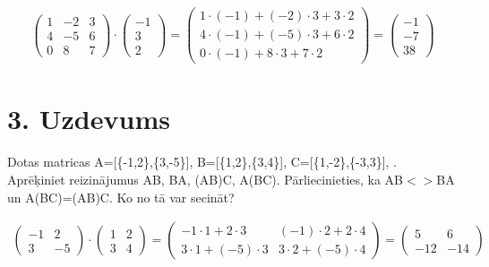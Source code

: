 \documentclass{article}
\begin{document}
\begin{gather*}
    \begin{pmatrix}
        1 & -2 & 3\\
        4 & -5 & 6\\
        0 & 8 & 7
    \end{pmatrix}
    \cdot
    \begin{pmatrix}
        -1\\
        3\\
        2
    \end{pmatrix}
    =
    \begin{pmatrix}
        1 \cdot (-1) + (-2) \cdot 3 + 3 \cdot 2\\
        4 \cdot (-1) + (-5) \cdot 3 + 6 \cdot 2\\
        0 \cdot (-1) + 8 \cdot 3 + 7 \cdot 2
    \end{pmatrix}
    =
    \begin{pmatrix}
        -1\\
        -7\\
        38
    \end{pmatrix}
\end{gather*}

\clearpage

\section*{3. Uzdevums}
Dotas matricas A=[\{-1,2\},\{3,-5\}], B=[\{1,2\},\{3,4\}], C=[\{1,-2\},\{-3,3\}], . Aprēķiniet reizinājumus AB, BA, (AB)C, A(BC). Pārliecinieties, ka AB$<>$BA un A(BC)=(AB)C. Ko no tā var secināt?

\begin{gather*}
    \begin{pmatrix}
        -1 & 2\\
        3 & -5
    \end{pmatrix}
    \cdot
    \begin{pmatrix}
        1 & 2\\
        3 & 4
    \end{pmatrix}
    =
    \begin{pmatrix}
        -1 \cdot 1 + 2 \cdot 3 & (-1) \cdot 2 + 2 \cdot 4\\
        3 \cdot 1 + (-5) \cdot 3 & 3 \cdot 2 + (-5) \cdot 4
    \end{pmatrix}
    =
    \begin{pmatrix}
        5 & 6\\
        -12 & -14
    \end{pmatrix}
\end{gather*}
\end{document}
